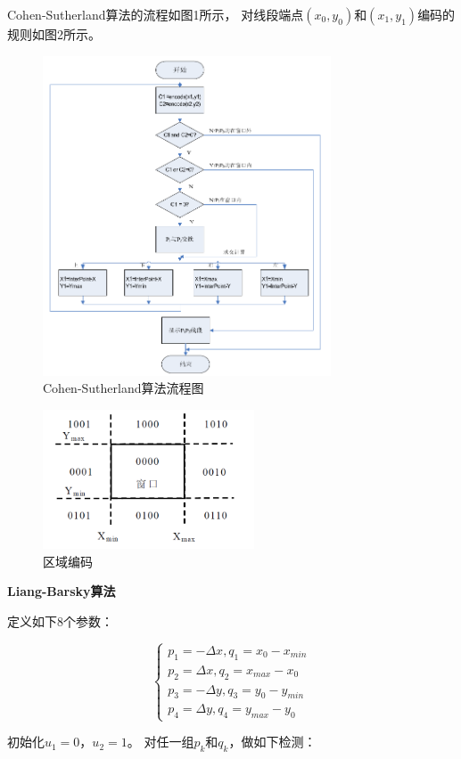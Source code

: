 \documentclass[a4paper,UTF8]{article}
\theoremstyle{definition}
\begin{document}
Cohen-Sutherland算法的流程如图1所示，
对线段端点$(x_0,y_0)$和$(x_1,y_1)$编码的规则如图2所示。
\begin{figure}[H]
    \centering
    \includegraphics[width=8.55cm,height=9.5cm]{cohen-sutherland-flow.PNG}
    \caption{Cohen-Sutherland算法流程图}
\end{figure}
\begin{figure}[H]
    \centering
    \includegraphics[width=6.28cm,height=4.14cm]{cohen-sutherland-encode.PNG}
    \caption{区域编码}
\end{figure}


\textbf{Liang-Barsky算法}

定义如下8个参数：

\begin{equation*}
    \begin{cases}
        p_1=-\Delta x,q_1=x_0-x_{min}\\
        p_2=\Delta x,q_2=x_{max}-x_0\\
        p_3=-\Delta y,q_3=y_0-y_{min}\\
        p_4=\Delta y,q_4=y_{max}-y_0
    \end{cases}
\end{equation*}

初始化$u_1=0$，$u_2=1$。
对任一组$p_k$和$q_k$，做如下检测：
\end{document}
